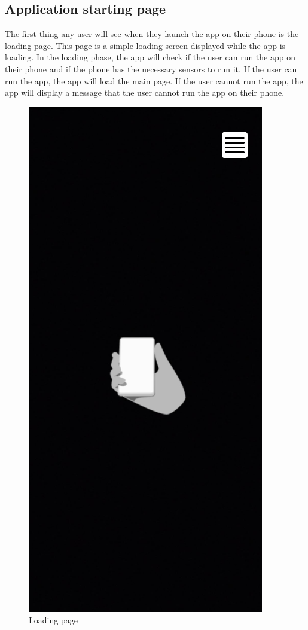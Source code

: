 \subsection{Application starting page}
The first thing any user will see when they launch the app on their phone is the loading page. This page is a simple loading screen displayed while the app is loading. In the loading phase, the app will check if the user can run the app on their phone and if the phone has the necessary sensors to run it. If the user can run the app, the app will load the main page. If the user cannot run the app, the app will display a message that the user cannot run the app on their phone.
\begin{figure}[h!]
    \begin{center}
        \includegraphics[scale=0.5]{img/App_mock/iPhone 14 - 1.png}
        \caption{Loading page}
        \label{fig:loading-page}
    \end{center}
\end{figure}
\pagebreak


